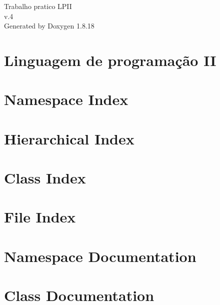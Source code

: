 \let\mypdfximage\pdfximage\def\pdfximage{\immediate\mypdfximage}\documentclass[twoside]{book}
\newcommand{\+}{\discretionary{\mbox{\scriptsize$\hookleftarrow$}}{}{}}
\newcommand{\clearemptydoublepage}{%
  \newpage{\pagestyle{empty}\cleardoublepage}%
}
\begin{document}
\hypersetup{pageanchor=false,
             bookmarksnumbered=true,
             pdfencoding=unicode
            }
\begin{titlepage}
\vspace*{7cm}
\begin{center}%
{\Large Trabalho pratico L\+P\+II \\[1ex]\large v.\+4 }\\
\vspace*{1cm}
{\large Generated by Doxygen 1.8.18}\\
\end{center}
\end{titlepage}
\clearemptydoublepage
{}
\tableofcontents
\clearemptydoublepage
{}
\hypersetup{pageanchor=true}

\chapter{Linguagem de programação II}
\label{index}\hypertarget{index}{}
\chapter{Namespace Index}

\chapter{Hierarchical Index}

\chapter{Class Index}

\chapter{File Index}

\chapter{Namespace Documentation}




\chapter{Class Documentation}










\end{document}
